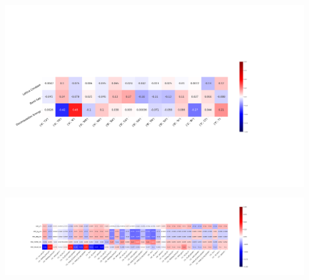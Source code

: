 \documentclass[twoside, twocolumn, 9pt, draft]{article}
\begin{document}
\begin{center}
\includegraphics[width=.9\linewidth]{HSE_v_comp_pearson2.png}
\end{center}
\begin{center}
\includegraphics[width=.9\linewidth]{HSE_v_site_prop_pearson.png}
\end{center}
\end{document}
